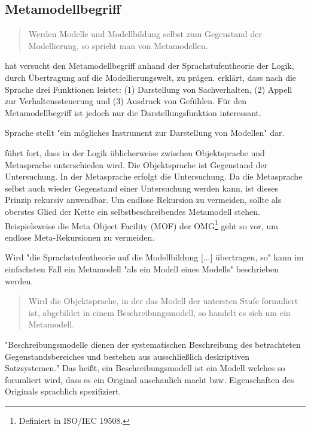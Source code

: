 \subsection{Metamodellbegriff}\label{sec.metamodellbegriff}

\begin{quote}
Werden Modelle und Modellbildung selbst zum Gegenstand der Modellierung, so spricht man von Metamodellen. \citep[S.~1]{stra}
\end{quote}

\citep{stra} hat versucht den Metamodellbegriff anhand der Sprachstufentheorie der Logik,
durch Übertragung auf die Modellierungswelt, zu prägen.
\citep[S.~1]{stra} erklärt, dass nach \citep{buehler} die Sprache drei Funktionen leistet:
(1) Darstellung von Sachverhalten, (2) Appell zur Verhaltenssteuerung und
(3) Ausdruck von Gefühlen.
Für den Metamodellbegriff ist jedoch nur die Darstellungsfunktion
interessant.

Sprache stellt "ein mögliches Instrument zur Darstellung von Modellen" dar.

\citep[S.~1]{stra} führt fort, dass in der Logik üblicherweise zwischen Objektsprache und Metasprache
unterschieden wird.
Die Objektsprache ist Gegenstand der Untersuchung.
In der Metasprache erfolgt die Untersuchung.
Da die Metasprache selbst auch wieder Gegenstand einer Untersuchung werden kann,
ist dieses Prinzip rekursiv anwendbar.
Um endlose Rekursion zu vermeiden, sollte als oberstes Glied der Kette ein selbstbeschreibendes
Metamodell stehen. Beispielsweise die Meta Object Facility (MOF) der OMG\footnote{Definiert in
ISO/IEC 19508.} geht so vor, um endlose Meta-Rekursionen zu vermeiden.

Wird "die Sprachstufentheorie auf die Modellbildung [...] übertragen, so" kann
im einfachsten Fall ein Metamodell "als ein Modell eines Modells" beschrieben werden.

\begin{quote}
Wird die Objektsprache, in der das Modell der untersten Stufe formuliert ist, abgebildet in einem Beschreibungsmodell, so handelt es sich um ein Metamodell.\citep[S.~3]{stra}
\end{quote}

"Beschreibungsmodelle dienen der systematischen Beschreibung des betrachteten Gegenstandsbereiches und bestehen aus ausschließlich deskriptiven Satzsystemen."
Das heißt, ein Beschreibungsmodell ist ein Modell welches so forumliert wird, dass es
ein Original anschaulich macht bzw. Eigenschaften des Originals sprachlich spezifiziert.

